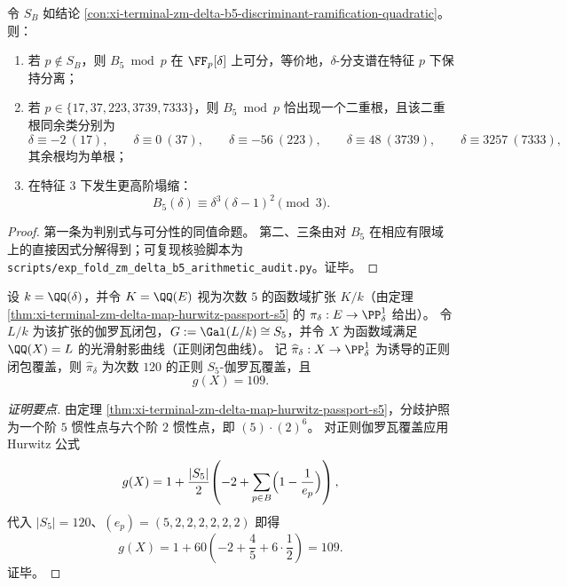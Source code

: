 \begin{conclusion}\label{con:xi-terminal-zm-delta-b5-bad-reduction-primes-collision-fingerprint}
令 \(S_B\) 如结论 \ref{con:xi-terminal-zm-delta-b5-discriminant-ramification-quadratic}。
则：
\begin{enumerate}
  \item 若 \(p\notin S_B\)，则 \(B_5\bmod p\) 在 \(\FF_p[\delta]\) 上可分，等价地，\(\delta\)-分支谱在特征 \(p\) 下保持分离；
  \item 若 \(p\in\{17,37,223,3739,7333\}\)，则 \(B_5\bmod p\) 恰出现一个二重根，且该二重根同余类分别为
  \[
  \delta\equiv -2\ (17),\qquad
  \delta\equiv 0\ (37),\qquad
  \delta\equiv -56\ (223),\qquad
  \delta\equiv 48\ (3739),\qquad
  \delta\equiv 3257\ (7333),
  \]
  其余根均为单根；
  \item 在特征 \(3\) 下发生更高阶塌缩：
  \[
  B_5(\delta)\equiv \delta^{3}(\delta-1)^{2}\pmod 3.
  \]
\end{enumerate}
\end{conclusion}
\begin{proof}
第一条为判别式与可分性的同值命题。
第二、三条由对 \(B_5\) 在相应有限域上的直接因式分解得到；可复现核验脚本为 \texttt{scripts/exp\_fold\_zm\_delta\_b5\_arithmetic\_audit.py}。证毕。
\end{proof}



\begin{conclusion}\label{con:xi-terminal-zm-delta-s5-regular-closure-genus-109}
设 \(k=\QQ(\delta)\)，并令 \(K=\QQ(E)\) 视为次数 \(5\) 的函数域扩张 \(K/k\)（由定理 \ref{thm:xi-terminal-zm-delta-map-hurwitz-passport-s5} 的 \(\pi_\delta:E\to\PP^1_\delta\) 给出）。
令 \(L/k\) 为该扩张的伽罗瓦闭包，\(G:=\Gal(L/k)\cong S_5\)，并令 \(X\) 为函数域满足 \(\QQ(X)=L\) 的光滑射影曲线（正则闭包曲线）。
记 \(\widehat\pi_\delta:X\to\PP^1_\delta\) 为诱导的正则闭包覆盖，则 \(\widehat\pi_\delta\) 为次数 \(120\) 的正则 \(S_5\)-伽罗瓦覆盖，且
\[
g(X)=109.
\]
\end{conclusion}
\begin{proof}[证明要点]
由定理 \ref{thm:xi-terminal-zm-delta-map-hurwitz-passport-s5}，分歧护照为一个阶 \(5\) 惯性点与六个阶 \(2\) 惯性点，即 \((5)\cdot(2)^6\)。
对正则伽罗瓦覆盖应用 Hurwitz 公式
\[
g(X)=1+\frac{|S_5|}{2}\!\left(-2+\sum_{p\in B}\Bigl(1-\frac1{e_p}\Bigr)\right),
\]
代入 \(|S_5|=120\)、\((e_p)=(5,2,2,2,2,2,2)\) 即得
\[
g(X)=1+60\left(-2+\frac45+6\cdot\frac12\right)=109.
\]
证毕。
\end{proof}

